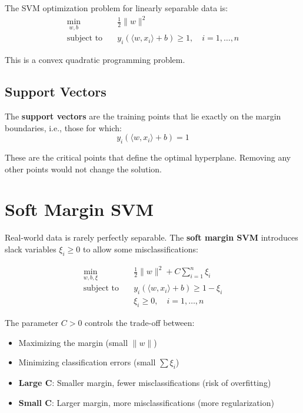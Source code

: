\documentclass{tufte-handout}
\begin{document}
The SVM optimization problem for linearly separable data is:
\begin{align}
\min_{w, b} \quad & \frac{1}{2}\|w\|^2 \\
\text{subject to} \quad & y_i(\langle w, x_i \rangle + b) \geq 1, \quad i = 1, \ldots, n
\end{align}

This is a convex quadratic programming problem.

\subsection{Support Vectors}

The \textbf{support vectors} are the training points that lie exactly on the margin boundaries, i.e., those for which:
\[
y_i(\langle w, x_i \rangle + b) = 1
\]

These are the critical points that define the optimal hyperplane. Removing any other points would not change the solution.

\section{Soft Margin SVM}

Real-world data is rarely perfectly separable. The \textbf{soft margin SVM} introduces slack variables $\xi_i \geq 0$ to allow some misclassifications:

\begin{align}
\min_{w, b, \xi} \quad & \frac{1}{2}\|w\|^2 + C \sum_{i=1}^{n} \xi_i \\
\text{subject to} \quad & y_i(\langle w, x_i \rangle + b) \geq 1 - \xi_i \\
& \xi_i \geq 0, \quad i = 1, \ldots, n
\end{align}

The parameter $C > 0$ controls the trade-off between:
\begin{itemize}
    \item Maximizing the margin (small $\|w\|$)
    \item Minimizing classification errors (small $\sum \xi_i$)
\end{itemize}

\begin{itemize}
    \item \textbf{Large C}: Smaller margin, fewer misclassifications (risk of overfitting)
    \item \textbf{Small C}: Larger margin, more misclassifications (more regularization)
\end{itemize}
\end{document}

